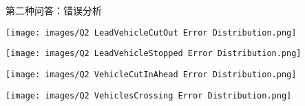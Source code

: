 \documentclass[serif]{beamer}
\begin{document}
\begin{frame}{第二种问答：错误分析}

\begin{minipage}[t]{0.4\textwidth}
  \centering
  \texttt{[image: images/Q2 LeadVehicleCutOut Error Distribution.png]}
\end{minipage}
\hfill
\begin{minipage}[t]{0.4\textwidth}
  \centering
  \texttt{[image: images/Q2 LeadVehicleStopped Error Distribution.png]}
\end{minipage}


\begin{minipage}[t]{0.4\textwidth}
  \centering
  \texttt{[image: images/Q2 VehicleCutInAhead Error Distribution.png]}
\end{minipage}
\hfill
\begin{minipage}[t]{0.4\textwidth}
  \centering
  \texttt{[image: images/Q2 VehiclesCrossing Error Distribution.png]}
\end{minipage}


\end{frame}
\end{document}

